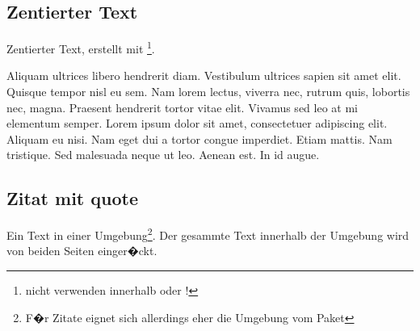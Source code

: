 \subsection{Zentierter Text}
%
Zentierter Text, erstellt mit \footnote{nicht verwenden innerhalb
    oder !}.
\begin{center}
   Aliquam ultrices libero hendrerit diam. Vestibulum ultrices sapien sit amet elit. Quisque tempor nisl eu sem. Nam lorem lectus, viverra nec, rutrum quis, lobortis nec, magna. Praesent hendrerit tortor vitae elit. Vivamus sed leo at mi elementum semper. Lorem ipsum dolor sit amet, consectetuer adipiscing elit. Aliquam eu nisi. Nam eget dui a tortor congue imperdiet. Etiam mattis. Nam tristique. Sed malesuada neque ut leo. Aenean est. In id augue.
\end{center}

\subsection{Zitat mit quote}
Ein Text in einer  Umgebung\footnote{F�r Zitate eignet sich
   allerdings eher die Umgebung  vom Paket }.
Der gesammte Text innerhalb der Umgebung wird von beiden Seiten einger�ckt.

